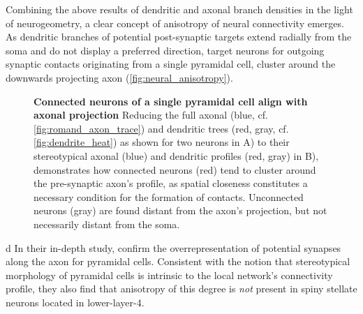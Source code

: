 Combining the above results of dendritic and axonal branch densities
in the light of neurogeometry, a clear concept of anisotropy of neural
connectivity emerges. As dendritic branches of potential post-synaptic
targets extend radially from the soma and do not display a preferred
direction, target neurons for outgoing synaptic contacts originating
from a single pyramidal cell, cluster around the downwards projecting
axon (\autoref{fig:neural_anisotropy}). %
\begin{figure}[!ht]
  \centering 

    \caption{%
      \textbf{Connected neurons of a single pyramidal cell align with
        axonal projection} Reducing the full axonal (blue,
      cf. \autoref{fig:romand_axon_trace}) and dendritic trees (red, gray,
      cf. \autoref{fig:dendrite_heat}) as shown for two neurons in A)
      to their stereotypical axonal (blue) and dendritic profiles
      (red, gray) in B), demonstrates how connected neurons (red) tend
      to cluster around the pre-synaptic axon's profile, as spatial
      closeness constitutes a necessary condition for the formation of
      contacts. Unconnected neurons (gray) are found distant from the
      axon's projection, but not necessarily distant from the soma. }
  \label{fig:neural_anisotropy}
\end{figure}
d%
In their in-depth study, \textcite{Stepanyants2005} confirm the
overrepresentation of potential synapses along the axon for pyramidal
cells. Consistent with the notion that stereotypical morphology of
pyramidal cells is intrinsic to the local network's connectivity
profile, they also find that anisotropy of this degree is \textit{not}
present in spiny stellate neurons located in lower-layer-4.



